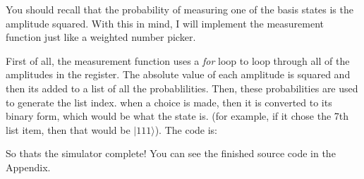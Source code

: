 \documentclass[../main.tex]{subfiles}
\begin{document}
You should recall that the probability of measuring one of the basis states is the amplitude squared.
With this in mind, I will implement the measurement function just like a weighted number picker.

First of all, the measurement function uses a \emph{for} loop to loop through all of the amplitudes in the register. The absolute value of each amplitude is squared and then its added to a list of all the probablilities. 
Then, these probabilities are used to generate the list index. when a choice is made, then it is converted to its binary form, which would be what the state is. (for example, if it chose the 7th list item, then that would be \(\lvert 111 \rangle \)).
The code is:


So thats the simulator complete! You can see the finished source code in the Appendix.
\end{document}
